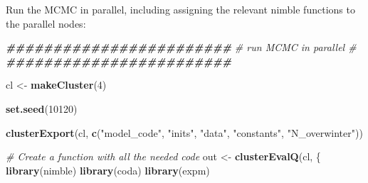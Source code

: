 \documentclass[
]{article}
\newenvironment{Shaded}{\begin{snugshade}}{\end{snugshade}}
\newcommand{\CommentTok}[1]{\textcolor[rgb]{0.56,0.35,0.01}{\textit{#1}}}
\newcommand{\DecValTok}[1]{\textcolor[rgb]{0.00,0.00,0.81}{#1}}
\newcommand{\DocumentationTok}[1]{\textcolor[rgb]{0.56,0.35,0.01}{\textbf{\textit{#1}}}}
\newcommand{\FunctionTok}[1]{\textcolor[rgb]{0.13,0.29,0.53}{\textbf{#1}}}
\newcommand{\NormalTok}[1]{#1}
\newcommand{\OtherTok}[1]{\textcolor[rgb]{0.56,0.35,0.01}{#1}}
\newcommand{\StringTok}[1]{\textcolor[rgb]{0.31,0.60,0.02}{#1}}
\begin{document}
Run the MCMC in parallel, including assigning the relevant nimble
functions to the parallel nodes:

\begin{Shaded}
\begin{Highlighting}[]
\DocumentationTok{\#\#\#\#\#\#\#\#\#\#\#\#\#\#\#\#\#\#\#\#\#\#\#\#}
\CommentTok{\# run MCMC in parallel \#}
\DocumentationTok{\#\#\#\#\#\#\#\#\#\#\#\#\#\#\#\#\#\#\#\#\#\#\#\#}

\NormalTok{cl }\OtherTok{\textless{}{-}} \FunctionTok{makeCluster}\NormalTok{(}\DecValTok{4}\NormalTok{)}

\FunctionTok{set.seed}\NormalTok{(}\DecValTok{10120}\NormalTok{)}

\FunctionTok{clusterExport}\NormalTok{(cl, }\FunctionTok{c}\NormalTok{(}\StringTok{"model\_code"}\NormalTok{, }\StringTok{"inits"}\NormalTok{, }\StringTok{"data"}\NormalTok{, }\StringTok{"constants"}\NormalTok{, }\StringTok{"N\_overwinter"}\NormalTok{))}

\CommentTok{\# Create a function with all the needed code}
\NormalTok{out }\OtherTok{\textless{}{-}} \FunctionTok{clusterEvalQ}\NormalTok{(cl, \{}
  \FunctionTok{library}\NormalTok{(nimble)}
  \FunctionTok{library}\NormalTok{(coda)}
  \FunctionTok{library}\NormalTok{(expm)}


\end{Highlighting}
\end{Shaded}
\end{document}
